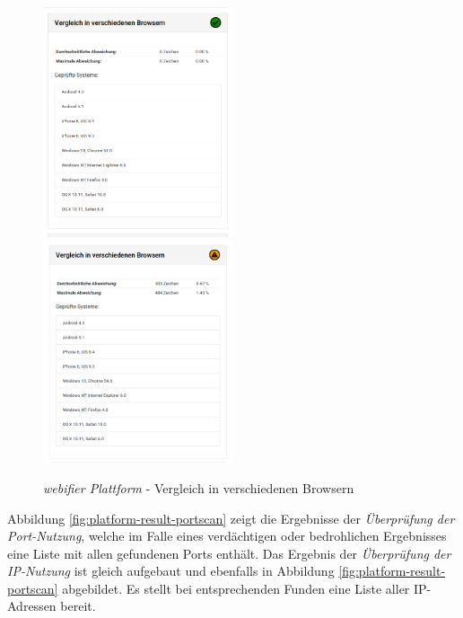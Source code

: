 \begin{figure}[H]
\centerline{%
\includegraphics[width=0.5\textwidth]{images/platform/header-inspection-clean}%
\includegraphics[width=0.5\textwidth]{images/platform/header-inspection-suspicious}%
}%
\caption{\textit{webifier Plattform} - Vergleich in verschiedenen Browsern}
\label{fig:platform-result-header-inspection}
\end{figure}

Abbildung \ref{fig:platform-result-portscan} zeigt die Ergebnisse der \textit{Überprüfung der
Port-Nutzung}, welche im Falle eines verdächtigen oder bedrohlichen Ergebnisses eine Liste mit allen
gefundenen Ports enthält. Das Ergebnis der \textit{Überprüfung der IP-Nutzung} ist gleich aufgebaut
und ebenfalls in Abbildung \ref{fig:platform-result-portscan} abgebildet. Es stellt bei
entsprechenden Funden eine Liste aller IP-Adressen bereit.

